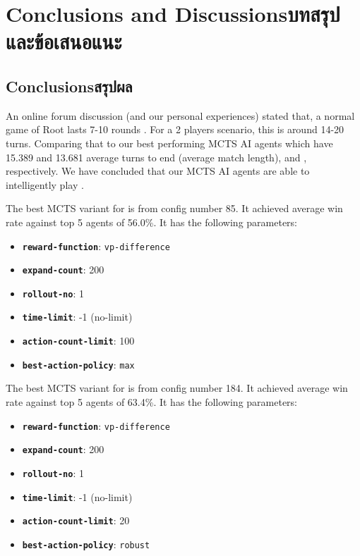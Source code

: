 \chapter{\ifenglish Conclusions and Discussions\else บทสรุปและข้อเสนอแนะ\fi}

\section{\ifenglish Conclusions\else สรุปผล\fi}

An online forum discussion (and our personal experiences) stated that, a normal game of Root lasts 7-10 rounds \cite{Reddit_TurnsToWin}. For a 2 players scenario, this is around 14-20 turns. Comparing that to our best performing MCTS AI agents which have 15.389 and 13.681 average turns to end (average match length), \Marquise{} and \Eyrie{}, respectively. We have concluded that our MCTS AI agents are able to intelligently play \RootB{}.

The best MCTS variant for \Marquise{} is from config number 85. It achieved average win rate against top 5 \Eyrie{} agents of 56.0\%. It has the following parameters:
\begin{itemize}
    \item \textbf{\texttt{reward-function}}: \texttt{vp-difference}
    \item \textbf{\texttt{expand-count}}: 200
    \item \textbf{\texttt{rollout-no}}: 1
    \item \textbf{\texttt{time-limit}}: -1 (no-limit)
    \item \textbf{\texttt{action-count-limit}}: 100
    \item \textbf{\texttt{best-action-policy}}: \texttt{max}
\end{itemize}
The best MCTS variant for \Eyrie{} is from config number 184. It achieved average win rate against top 5 \Marquise{} agents of 63.4\%. It has the following parameters:
\begin{itemize}
    \item \textbf{\texttt{reward-function}}: \texttt{vp-difference}
    \item \textbf{\texttt{expand-count}}: 200
    \item \textbf{\texttt{rollout-no}}: 1
    \item \textbf{\texttt{time-limit}}: -1 (no-limit)
    \item \textbf{\texttt{action-count-limit}}: 20
    \item \textbf{\texttt{best-action-policy}}: \texttt{robust}
\end{itemize}

